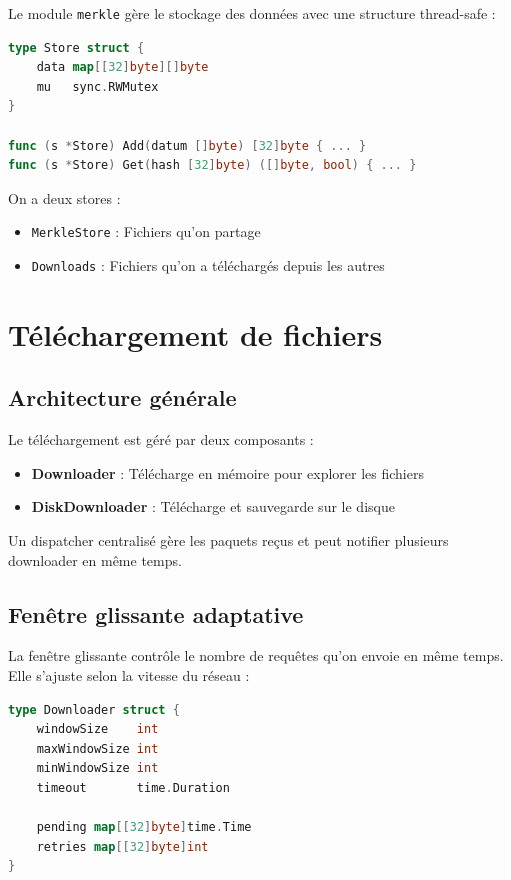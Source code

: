 \documentclass[11pt,a4paper]{report}
\begin{document}
Le module \texttt{merkle} gère le stockage des données avec une structure thread-safe :

\begin{lstlisting}[language=Go]
type Store struct {
    data map[[32]byte][]byte
    mu   sync.RWMutex
}

func (s *Store) Add(datum []byte) [32]byte { ... }
func (s *Store) Get(hash [32]byte) ([]byte, bool) { ... }
\end{lstlisting}

On a deux stores :
\begin{itemize}
    \item \texttt{MerkleStore} : Fichiers qu'on partage
    \item \texttt{Downloads} : Fichiers qu'on a téléchargés depuis les autres
\end{itemize}



\section{Téléchargement de fichiers}

\subsection{Architecture générale}

Le téléchargement est géré par deux composants :

\begin{itemize}
    \item \textbf{Downloader} : Télécharge en mémoire pour explorer les fichiers
    \item \textbf{DiskDownloader} : Télécharge et sauvegarde sur le disque
\end{itemize}

Un dispatcher centralisé gère les paquets reçus et peut notifier plusieurs downloader en même temps.

\subsection{Fenêtre glissante adaptative}

La fenêtre glissante contrôle le nombre de requêtes qu'on envoie en même temps. Elle s'ajuste selon la vitesse du réseau :

\begin{lstlisting}[language=Go]
type Downloader struct {
    windowSize    int
    maxWindowSize int
    minWindowSize int
    timeout       time.Duration
    
    pending map[[32]byte]time.Time
    retries map[[32]byte]int
}
\end{lstlisting}
\end{document}
